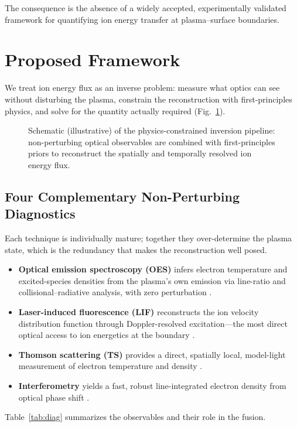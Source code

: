 \documentclass[conference]{IEEEtran}
\newcommand{\GammaE}{\Gamma_{E}}
\begin{document}
The consequence is the absence of a widely accepted, experimentally validated framework for quantifying ion energy transfer at plasma--surface boundaries.

\section{Proposed Framework}
We treat ion energy flux as an inverse problem: measure what optics can see without disturbing the plasma, constrain the reconstruction with first-principles physics, and solve for the quantity actually required (Fig.~\ref{fig:pipeline}).

\begin{figure}[t]
\centering
{}
\caption{Schematic (illustrative) of the physics-constrained inversion pipeline: non-perturbing optical observables are combined with first-principles priors to reconstruct the spatially and temporally resolved ion energy flux.}
\label{fig:pipeline}
\end{figure}

\subsection{Four Complementary Non-Perturbing Diagnostics}
Each technique is individually mature; together they over-determine the plasma state, which is the redundancy that makes the reconstruction well posed.
\begin{itemize}
\item \textbf{Optical emission spectroscopy (OES)} infers electron temperature and excited-species densities from the plasma's own emission via line-ratio and collisional--radiative analysis, with zero perturbation \cite{ref0227,ref0260,ref0261}.
\item \textbf{Laser-induced fluorescence (LIF)} reconstructs the ion velocity distribution function through Doppler-resolved excitation---the most direct optical access to ion energetics at the boundary \cite{ref0292,ref0328,ref0329}.
\item \textbf{Thomson scattering (TS)} provides a direct, spatially local, model-light measurement of electron temperature and density \cite{ref0354,ref0355}.
\item \textbf{Interferometry} yields a fast, robust line-integrated electron density from optical phase shift \cite{ref0388,ref0389}.
\end{itemize}
Table~\ref{tab:diag} summarizes the observables and their role in the fusion.
\end{document}
